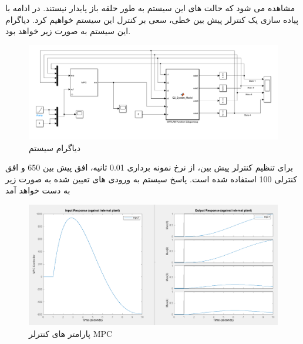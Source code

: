 مشاهده می شود که حالت های این سیستم به طور حلقه باز پایدار نیستند.
در ادامه با پیاده سازی یک کنترلر پیش بین خطی، سعی بر کنترل این سیستم خواهیم کرد. دیاگرام این سیستم به صورت زیر خواهد بود.
\begin{figure}[H]
	\centering
	\includegraphics[width=1\linewidth]{../img/Q2_LMPC_diagram}
	\caption{دیاگرام سیستم}
	\label{fig:q2lmpcdiagram}
\end{figure}
برای تنظیم کنترلر پیش بین، از نرخ نمونه برداری 0.01 ثانیه، افق پیش بین 650 و افق کنترلی 100 استفاده شده است. پاسخ سیستم به ورودی های تعیین شده به صورت زیر به دست خواهد آمد

\begin{figure}[H]
	\centering
	\includegraphics[width=1\linewidth]{../img/Q2_LMPC_ِDesign}
	\caption{پارامتر های کنترلر MPC}
	\label{fig:q2lmpcdesign}
\end{figure}

